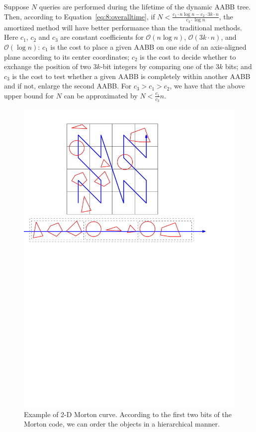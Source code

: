 Suppose $N$ queries are performed during the lifetime of the dynamic
AABB tree. Then, according to Equation~\ref{eq:8:overalltime},
if $N < \frac{c_1 \cdot n \log n - c_2 \cdot 3 k \cdot n}{c_3 \cdot \log n}$, the amortized method will have better
performance than the traditional methods. Here $c_1$, $c_2$ and $c_3$ are constant coefficients for $\mathcal O(n\log n)$, $\mathcal O(3k \cdot n)$, and $\mathcal O(\log n)$: $c_1$ is the cost to place a given AABB on one side of an axis-aligned plane according to its center coordinates; $c_2$ is the cost to decide whether to exchange the position of two $3k$-bit integers by comparing one of the $3k$ bits; and $c_3$ is the cost to test whether a given AABB is completely within another AABB and if not, enlarge the second AABB. For $c_3 > c_1 > c_2$, we have that the above upper bound for $N$ can be approximated by $N < \frac{c_1}{c_3} n$.

\begin{figure}[htbp]
\centering
\includegraphics[width=0.8\linewidth]{figs/8/morton.pdf}
\caption[Illustration of 2-D Morton curve]{\label{fig:8:morton} Example of 2-D Morton curve. According to the first two
bits of the Morton code, we can order the objects in a hierarchical manner.}
\end{figure}


